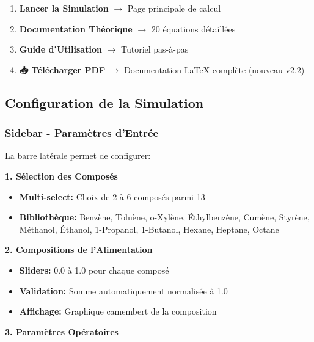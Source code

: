 \documentclass[11pt,a4paper]{article}
\begin{document}
\begin{enumerate}[leftmargin=*]
    \item \textbf{Lancer la Simulation} $\rightarrow$ Page principale de calcul
    \item \textbf{Documentation Théorique} $\rightarrow$ 20 équations détaillées
    \item \textbf{Guide d'Utilisation} $\rightarrow$ Tutoriel pas-à-pas
    \item \textbf{📥 Télécharger PDF} $\rightarrow$ Documentation LaTeX complète (nouveau v2.2)
\end{enumerate}

\subsection{Configuration de la Simulation}

\subsubsection{Sidebar - Paramètres d'Entrée}

La barre latérale permet de configurer:

\textbf{1. Sélection des Composés}

\begin{itemize}[leftmargin=*]
    \item \textbf{Multi-select:} Choix de 2 à 6 composés parmi 13
    \item \textbf{Bibliothèque:} Benzène, Toluène, o-Xylène, Éthylbenzène, Cumène, Styrène, Méthanol, Éthanol, 1-Propanol, 1-Butanol, Hexane, Heptane, Octane
\end{itemize}

\textbf{2. Compositions de l'Alimentation}

\begin{itemize}[leftmargin=*]
    \item \textbf{Sliders:} 0.0 à 1.0 pour chaque composé
    \item \textbf{Validation:} Somme automatiquement normalisée à 1.0
    \item \textbf{Affichage:} Graphique camembert de la composition
\end{itemize}

\textbf{3. Paramètres Opératoires}
\end{document}
